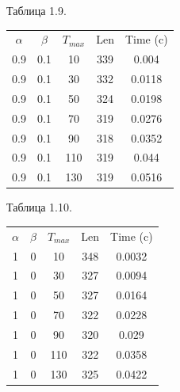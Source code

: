 \documentclass[12pt]{report}
\begin{document}
	\begin{minipage}{0.5\textwidth}
		\begin{center}
			Таблица 1.9.
			
			\begin{tabular}{|c c c c c|}
				\hline
				$\alpha$ & $\beta$ & $T_{max}$ & Len & Time (c) \\ [0.5ex]
				0.9 & 0.1 & 10 & 339 & 0.004 \\ 
				\hline 
				0.9 & 0.1 & 30 & 332 & 0.0118 \\ 
				\hline 
				0.9 & 0.1 & 50 & 324 & 0.0198 \\ 
				\hline 
				0.9 & 0.1 & 70 & 319 & 0.0276 \\ 
				\hline 
				0.9 & 0.1 & 90 & 318 & 0.0352 \\ 
				\hline 
				0.9 & 0.1 & 110 & 319 & 0.044 \\ 
				\hline 
				0.9 & 0.1 & 130 & 319 & 0.0516 \\ 
				\hline 
			\end{tabular}
		\end{center}
	\end{minipage}
	\hfill
	\begin{minipage}{0.5\textwidth}
		\begin{center}
			Таблица 1.10.
			
			\begin{tabular}{|c c c c c|}
				\hline
				$\alpha$ & $\beta$ & $T_{max}$ & Len & Time (c) \\ [0.5ex]
				1 & 0 & 10 & 348 & 0.0032 \\ 
				\hline 
				1 & 0 & 30 & 327 & 0.0094 \\ 
				\hline 
				1 & 0 & 50 & 327 & 0.0164 \\ 
				\hline 
				1 & 0 & 70 & 322 & 0.0228 \\ 
				\hline 
				1 & 0 & 90 & 320 & 0.029 \\ 
				\hline 
				1 & 0 & 110 & 322 & 0.0358 \\ 
				\hline 
				1 & 0 & 130 & 325 & 0.0422 \\ 
				\hline 
			\end{tabular}
		\end{center}
	\end{minipage}
\end{document}
